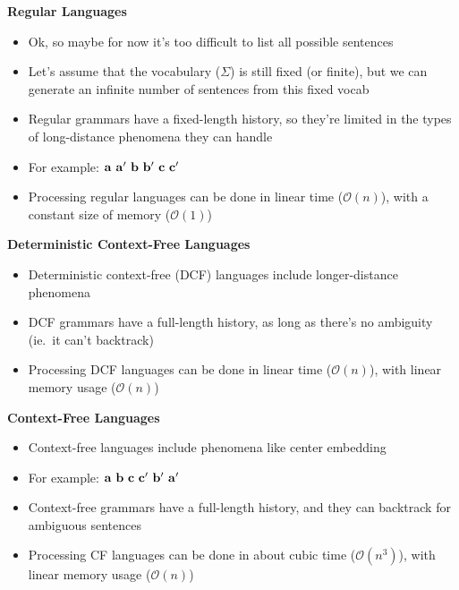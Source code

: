 \documentclass{beamer}
\newcommand{\detail}[1]{{\color{lightgrey}\small{}#1}}
\newcommand{\pagestepalt}[2]{
  \begin{frame}[t]
    \begin{minipage}[t][0.26\textheight][t]{\textwidth}
      \begin{center}
        \huge
        \textbf{#1}
      \end{center}
    \end{minipage}
    
    \begin{minipage}[t][0.7\textheight][c]{\textwidth}
      #2
    \end{minipage}
  \end{frame}
}
\begin{document}
\pagestepalt{Regular Languages}{
\begin{block}{}
\begin{itemize}
	\item Ok, so maybe for now it's too difficult to list all possible sentences
	\item Let's assume that the vocabulary ($\Sigma$) is still fixed (or finite), but we can generate an infinite number of sentences from this fixed vocab
	\item Regular grammars have a fixed-length history, so they're limited in the types of long-distance phenomena they can handle
	\pause
	\item For example: $\bf a \ a^{\prime} \ b \ b^{\prime} \ c \ c^{\prime}$
	\pause
	\item Processing regular languages can be done in linear time \detail{($\mathcal{O}(n)$)}, with a constant size of memory \detail{($\mathcal{O}(1)$)}
\end{itemize}
\end{block}
}


\pagestepalt{Deterministic Context-Free Languages}{
\begin{block}{}
\begin{itemize}
	\item Deterministic context-free (DCF) languages include longer-distance phenomena
	\item DCF grammars have a full-length history, as long as there's no ambiguity (ie.\ it can't backtrack)
	\pause
	\item Processing DCF languages can be done in linear time \detail{($\mathcal{O}(n)$)}, with linear memory usage \detail{($\mathcal{O}(n)$)}
\end{itemize}
\end{block}
}


\pagestepalt{Context-Free Languages}{
\begin{block}{}
\begin{itemize}
	\item Context-free languages include phenomena like center embedding
	\item For example: $\bf a \ b \ c \ c^{\prime} \ b^{\prime} \ a^{\prime}$
	\pause
	\item Context-free grammars have a full-length history, and they can backtrack for ambiguous sentences
	\pause
	\item Processing CF languages can be done in about cubic time \detail{($\mathcal{O}(n^3)$)}, with linear memory usage \detail{($\mathcal{O}(n)$)}
\end{itemize}
\end{block}
}
\end{document}
